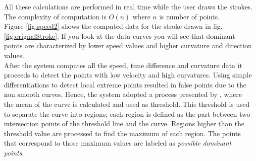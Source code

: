 \documentclass[a4paper,10pt]{IEEEconf}
\begin{document}
 All these calculations are performed in real time while the user draws the strokes. The complexity of computation is $O(n)$ where $n$ is number of points. \\
 Figure \ref{fig:speed2} shows the computed data for the stroke drawn in fig. \ref{fig:orignalStroke}. If you look at the data curves you will see that dominant points are characterized by lower speed values and higher curvature and direction values. \\%
After the system computes all the speed, time difference and curvature data it proceeds to detect the points with low velocity and high curvatures. Using simple differentiations to detect local extreme points resulted in false points due to the non smooth curves. Hence, the system adopted a process presented by \cite{earlyprocess}, where the mean
of the curve is calculated and used as threshold. This threshold is used to separate the curve into regions; each region is defined as the part between two intersection points of the threshold line and the curve. Regions higher than the threshold value are processed to find the maximum of each region. The points that correspond to those maximum values are labeled as \textit{possible dominant points}.   \\
\end{document}
